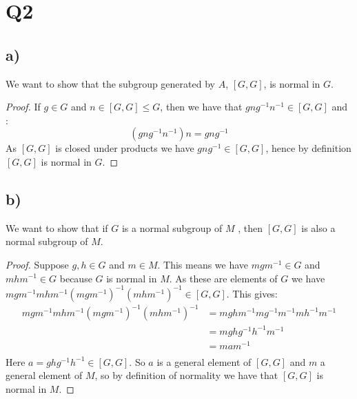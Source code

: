 \documentclass{article}
\begin{document}
\section*{Q2}
\subsection*{a)}
We want to show that the subgroup generated by $A$, $[G,G]$, is normal in $G$.
\begin{proof}
If $g\in G$ and $n\in [G,G]\leq G$, then we have that $gng^{-1}n^{-1}\in [G,G]$ and :
$$(gng^{-1}n^{-1})n=gng^{-1}$$
As $[G,G]$ is closed under products we have $gng^{-1}\in [G,G]$, hence by definition $[G,G]$ is normal in $G$.
\end{proof}
\subsection*{b)}
We want to show that if $G$ is a normal subgroup of $M$ , then $[G, G]$ is also a normal subgroup of $M$.
\begin{proof}
Suppose $g,h\in G$ and $m\in M$. This means we have $mgm^{-1}\in G$ and $mhm^{-1}\in G$ because $G$ is normal in $M$. As these are elements of $G$ we have $mgm^{-1}mhm^{-1}(mgm^{-1})^{-1}(mhm^{-1})^{-1}\in [G,G]$. This gives:
\begin{align*}
mgm^{-1}mhm^{-1}(mgm^{-1})^{-1}(mhm^{-1})^{-1}&=mghm^{-1}mg^{-1}m^{-1}mh^{-1}m^{-1}\\
&=mghg^{-1}h^{-1}m^{-1}\\
&=mam^{-1}\\
\end{align*}
Here $a=ghg^{-1}h^{-1}\in[G,G]$. So $a$ is a general element of $[G,G]$ and $m$ a general element of $M$, so by definition of normality we have that $[G,G]$ is normal in $M$.  
\end{proof}
\end{document}
